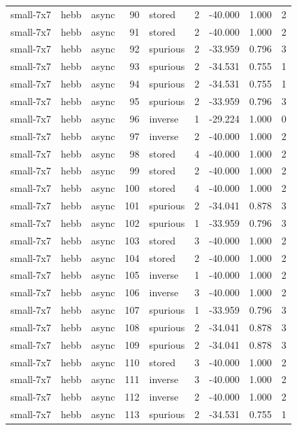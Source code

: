 \begin{tabular}{lllrlrrrr}
small-7x7 & hebb & async & 90 & stored & 2 & -40.000 & 1.000 & 2 \\
small-7x7 & hebb & async & 91 & stored & 2 & -40.000 & 1.000 & 2 \\
small-7x7 & hebb & async & 92 & spurious & 2 & -33.959 & 0.796 & 3 \\
small-7x7 & hebb & async & 93 & spurious & 2 & -34.531 & 0.755 & 1 \\
small-7x7 & hebb & async & 94 & spurious & 2 & -34.531 & 0.755 & 1 \\
small-7x7 & hebb & async & 95 & spurious & 2 & -33.959 & 0.796 & 3 \\
small-7x7 & hebb & async & 96 & inverse & 1 & -29.224 & 1.000 & 0 \\
small-7x7 & hebb & async & 97 & inverse & 2 & -40.000 & 1.000 & 2 \\
small-7x7 & hebb & async & 98 & stored & 4 & -40.000 & 1.000 & 2 \\
small-7x7 & hebb & async & 99 & stored & 2 & -40.000 & 1.000 & 2 \\
small-7x7 & hebb & async & 100 & stored & 4 & -40.000 & 1.000 & 2 \\
small-7x7 & hebb & async & 101 & spurious & 2 & -34.041 & 0.878 & 3 \\
small-7x7 & hebb & async & 102 & spurious & 1 & -33.959 & 0.796 & 3 \\
small-7x7 & hebb & async & 103 & stored & 3 & -40.000 & 1.000 & 2 \\
small-7x7 & hebb & async & 104 & stored & 2 & -40.000 & 1.000 & 2 \\
small-7x7 & hebb & async & 105 & inverse & 1 & -40.000 & 1.000 & 2 \\
small-7x7 & hebb & async & 106 & inverse & 3 & -40.000 & 1.000 & 2 \\
small-7x7 & hebb & async & 107 & spurious & 1 & -33.959 & 0.796 & 3 \\
small-7x7 & hebb & async & 108 & spurious & 2 & -34.041 & 0.878 & 3 \\
small-7x7 & hebb & async & 109 & spurious & 2 & -34.041 & 0.878 & 3 \\
small-7x7 & hebb & async & 110 & stored & 3 & -40.000 & 1.000 & 2 \\
small-7x7 & hebb & async & 111 & inverse & 3 & -40.000 & 1.000 & 2 \\
small-7x7 & hebb & async & 112 & inverse & 2 & -40.000 & 1.000 & 2 \\
small-7x7 & hebb & async & 113 & spurious & 2 & -34.531 & 0.755 & 1 \\

\end{tabular}
